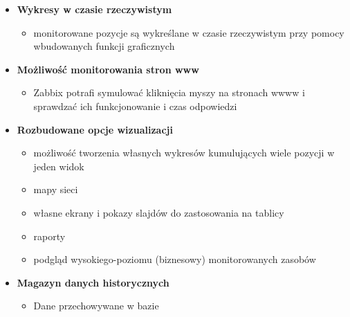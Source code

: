 \documentclass[12pt]{article}
\renewcommand{\_}{\kern-1.5pt\textunderscore\kern-1.5pt}
\begin{document}
\begin{itemize}
\begin{itemize}
\begin{itemize}
\begin{itemize}
\end{itemize}
	\item \textbf{Wykresy w czasie rzeczywistym}\par

\begin{itemize}
	\item monitorowane pozycje są wykreślane w czasie rzeczywistym przy pomocy wbudowanych funkcji graficznych\par


\end{itemize}
	\item \textbf{Możliwość monitorowania stron www}\par

\begin{itemize}
	\item Zabbix potrafi symulować kliknięcia myszy na stronach wwww i sprawdzać ich funkcjonowanie i czas odpowiedzi\par


\end{itemize}
	\item \textbf{Rozbudowane opcje wizualizacji}\par

\begin{itemize}
	\item możliwość tworzenia własnych wykresów kumulujących wiele pozycji w jeden widok\par

	\item mapy sieci\par

	\item własne ekrany i pokazy slajdów do zastosowania na tablicy\par

	\item raporty\par

	\item podgląd wysokiego-poziomu (biznesowy) monitorowanych zasobów\par


\end{itemize}
	\item \textbf{Magazyn danych historycznych}\par

\begin{itemize}
	\item Dane przechowywane w bazie\par


\end{itemize}
\end{itemize}
\end{itemize}
\end{itemize}
\end{document}
